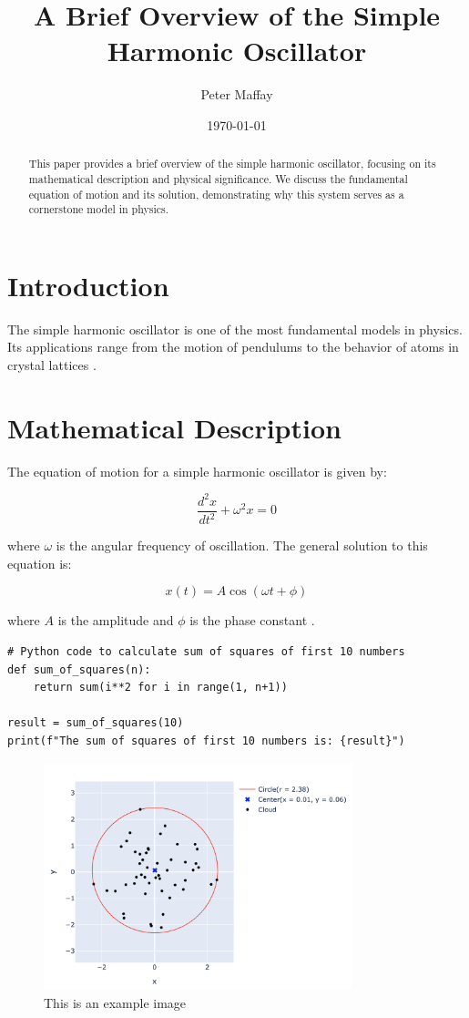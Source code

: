 \documentclass{article}  %
\title{A Brief Overview of the Simple Harmonic Oscillator}
\author{Peter Maffay}
\date{\today}
\begin{document}
\maketitle
\thispagestyle{fancy}

\begin{abstract}
This paper provides a brief overview of the simple harmonic oscillator,
focusing on its mathematical description and physical significance. We discuss
the fundamental equation of motion and its solution, demonstrating why this
system serves as a cornerstone model in physics.
\end{abstract}

\section{Introduction}
The simple harmonic oscillator is one of the most fundamental models in physics.
Its applications range from the motion of pendulums to the behavior of atoms
in crystal lattices \citep{feynman1963}.

\section{Mathematical Description}
The equation of motion for a simple harmonic oscillator is given by:

\begin{equation}
    \frac{d^2x}{dt^2} + \omega^2x = 0
\end{equation}

where $\omega$ is the angular frequency of oscillation. The general solution
to this equation is:

\begin{equation}
    x(t) = A\cos(\omega t + \phi)
\end{equation}

where $A$ is the amplitude and $\phi$ is the phase constant
\citep{goldstein2002}.

\begin{lstlisting}
# Python code to calculate sum of squares of first 10 numbers
def sum_of_squares(n):
    return sum(i**2 for i in range(1, n+1))

result = sum_of_squares(10)
print(f"The sum of squares of first 10 numbers is: {result}")
\end{lstlisting}

\begin{figure}[h]
    \centering
    \includegraphics[width=0.8\textwidth]{graph.png} %
    \caption{This is an example image}
    \label{fig:example}
\end{figure}



\end{document}
